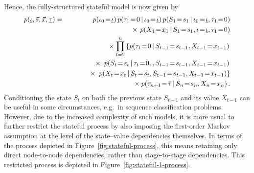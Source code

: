 \documentclass[a4paper]{article}
\begin{document}
Hence, the fully-structured stateful model is now given by
\begin{eqnarray}
p(\underline{\iota},\vec{s},\vec{x},\underline{\tau}) & = & 
p(\iota_0\!=\!\underline{\iota})\,p(\tau_1\!=\!0\,|\,\iota_0\!=\!\underline{\iota})
\,p(S_1\!=\!s_1\,|\,\iota_0\!=\!\underline{\iota},\tau_1\!=\!0)
\nonumber\\&&{}\times
\,p(X_1\!=\!x_1\,|\,S_1\!=\!s_1,\iota\!=\!\underline{\iota},\tau_1\!=\!0)
\nonumber\\&&
{}\times\prod_{t=2}^{n}\left\{p(\tau_t\!=\!0\,|\,S_{t-1}\!=\!s_{t-1},X_{t-1}\!=\!x_{t-1})\right.
\nonumber\\&&\hspace*{10mm}{}\times\left.
\,p(S_t\!=\!s_t\,|\,\tau_t\!=\!0,,S_{t-1}\!=\!s_{t-1},X_{t-1}\!=\!x_{t-1})\right.
\nonumber\\&&\hspace*{10mm}{}\times\left.
\,p(X_t\!=\!x_t\,|\,S_t\!=\!s_t,S_{t-1}\!=\!s_{t-1},X_{t-1}\!=\!x_{t-1})\right\}
\nonumber\\&&
{}\times p(\tau_{n+1}\!=\!\bar{\tau}\,|\,S_n\!=\!s_n,X_n\!=\!x_n)
\,.
\end{eqnarray}
Conditioning the state $S_t$ on both the previous state $S_{t-1}$ and its value $X_{t-1}$
can be useful in some circumstances, e.g.\ in sequence classification problems.
However, due to the increased complexity of such models, it is more usual to further restrict the stateful process
by also imposing the first-order Markov assumption at the level
of the state--value dependencies themselves. In terms of the process depicted in Figure~\ref{fig:stateful-process},
this means retaining only direct node-to-node dependencies, rather than stage-to-stage dependencies.
This restricted process is depicted in Figure~\ref{fig:stateful-1-process}.
\end{document}
